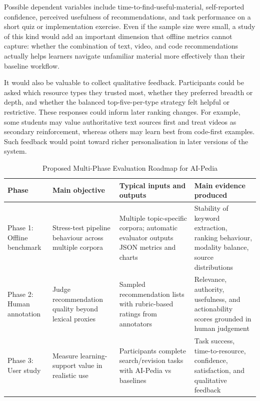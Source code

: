 \documentclass[10pt,journal,compsoc]{IEEEtran}
\begin{document}
Possible dependent variables include time-to-find-useful-material, self-reported confidence, perceived usefulness of recommendations, and task performance on a short quiz or implementation exercise. Even if the sample size were small, a study of this kind would add an important dimension that offline metrics cannot capture: whether the combination of text, video, and code recommendations actually helps learners navigate unfamiliar material more effectively than their baseline workflow.

It would also be valuable to collect qualitative feedback. Participants could be asked which resource types they trusted most, whether they preferred breadth or depth, and whether the balanced top-five-per-type strategy felt helpful or restrictive. These responses could inform later ranking changes. For example, some students may value authoritative text sources first and treat videos as secondary reinforcement, whereas others may learn best from code-first examples. Such feedback would point toward richer personalisation in later versions of the system.

\begin{table}[!t]
\renewcommand{\arraystretch}{1.2}
\caption{Proposed Multi-Phase Evaluation Roadmap for AI-Pedia}
\label{tab:evaluation_roadmap}
\centering
\footnotesize
\begin{tabular}{@{}p{2.0cm}p{3.0cm}p{5.0cm}p{4.2cm}@{}}
\hline\hline
Phase & Main objective & Typical inputs and outputs & Main evidence produced\\
\hline
Phase 1: Offline benchmark & Stress-test pipeline behaviour across multiple corpora & Multiple topic-specific corpora; automatic evaluator outputs JSON metrics and charts & Stability of keyword extraction, ranking behaviour, modality balance, source distributions\\
Phase 2: Human annotation & Judge recommendation quality beyond lexical proxies & Sampled recommendation lists with rubric-based ratings from annotators & Relevance, authority, usefulness, and actionability scores grounded in human judgement\\
Phase 3: User study & Measure learning-support value in realistic use & Participants complete search/revision tasks with AI-Pedia vs baselines & Task success, time-to-resource, confidence, satisfaction, and qualitative feedback\\
\hline\hline
\end{tabular}
\end{table}
\end{document}
